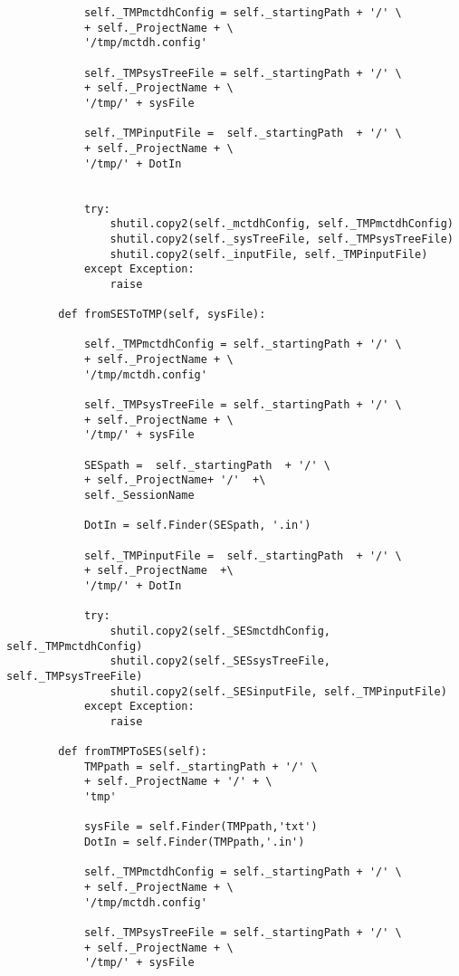 \begin{verbatim}
            self._TMPmctdhConfig = self._startingPath + '/' \
            + self._ProjectName + \
            '/tmp/mctdh.config'
    
            self._TMPsysTreeFile = self._startingPath + '/' \
            + self._ProjectName + \
            '/tmp/' + sysFile
    
            self._TMPinputFile =  self._startingPath  + '/' \
            + self._ProjectName + \
            '/tmp/' + DotIn
    
    
            try:
                shutil.copy2(self._mctdhConfig, self._TMPmctdhConfig) 
                shutil.copy2(self._sysTreeFile, self._TMPsysTreeFile)
                shutil.copy2(self._inputFile, self._TMPinputFile)
            except Exception:
                raise
    
        def fromSESToTMP(self, sysFile):    
    
            self._TMPmctdhConfig = self._startingPath + '/' \
            + self._ProjectName + \
            '/tmp/mctdh.config'
    
            self._TMPsysTreeFile = self._startingPath + '/' \
            + self._ProjectName + \
            '/tmp/' + sysFile
    
            SESpath =  self._startingPath  + '/' \
            + self._ProjectName+ '/'  +\
            self._SessionName
    
            DotIn = self.Finder(SESpath, '.in')
    
            self._TMPinputFile =  self._startingPath  + '/' \
            + self._ProjectName  +\
            '/tmp/' + DotIn
    
            try:
                shutil.copy2(self._SESmctdhConfig, self._TMPmctdhConfig) 
                shutil.copy2(self._SESsysTreeFile, self._TMPsysTreeFile)
                shutil.copy2(self._SESinputFile, self._TMPinputFile)
            except Exception:
                raise
    
        def fromTMPToSES(self):    
            TMPpath = self._startingPath + '/' \
            + self._ProjectName + '/' + \
            'tmp'
    
            sysFile = self.Finder(TMPpath,'txt')
            DotIn = self.Finder(TMPpath,'.in')
    
            self._TMPmctdhConfig = self._startingPath + '/' \
            + self._ProjectName + \
            '/tmp/mctdh.config'
    
            self._TMPsysTreeFile = self._startingPath + '/' \
            + self._ProjectName + \
            '/tmp/' + sysFile
    

\end{verbatim}
